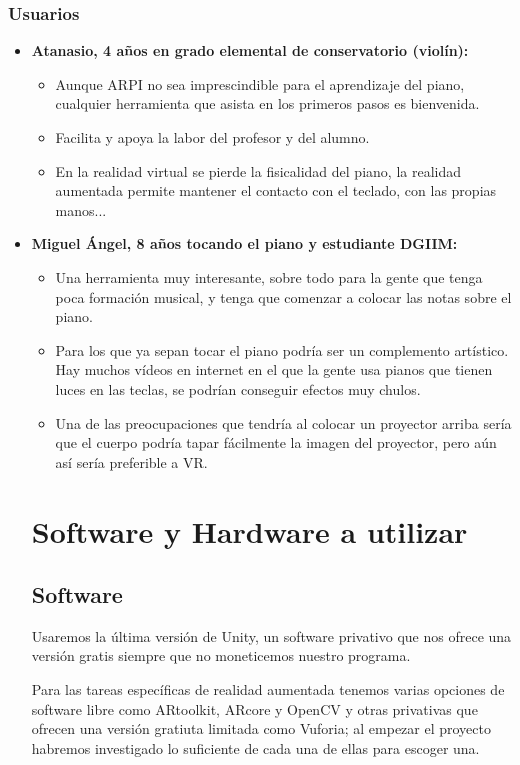 \subsubsection{Usuarios}
\begin{itemize}
	\item \textbf{Atanasio, 4 años en grado elemental de conservatorio (violín):} \label{tacho}
	\begin{itemize}
		\item Aunque ARPI no sea imprescindible para el aprendizaje del piano,
		cualquier herramienta que asista en los primeros pasos es bienvenida.
		\item Facilita y apoya la labor del profesor y del alumno.
		\item En la realidad virtual se pierde la fisicalidad del piano, la realidad aumentada
		permite mantener el contacto con el teclado, con las propias manos...
	\end{itemize}
		\item \textbf{Miguel Ángel, 8 años tocando el piano y estudiante DGIIM:}
		\begin{itemize}
			\item Una herramienta muy interesante, sobre todo para la gente que tenga 
			poca formación musical, y tenga que comenzar a colocar las notas sobre el piano.
			\item Para los que ya sepan tocar el piano podría ser un complemento artístico. 
			Hay muchos vídeos en internet en el que la gente usa pianos que tienen luces en 
			las teclas, se podrían conseguir efectos muy chulos.
			\item Una de las preocupaciones que tendría al colocar un proyector arriba 
			sería que el cuerpo podría tapar fácilmente la imagen del proyector, pero aún
			así sería preferible a VR.
\end{itemize}

\section{Software y Hardware a utilizar}
\subsection{Software}
Usaremos la última versión de Unity, un software privativo que nos
ofrece una versión gratis siempre que no moneticemos nuestro
programa.

Para las tareas específicas de realidad aumentada tenemos varias
opciones de software libre como ARtoolkit, ARcore y OpenCV y otras privativas
que ofrecen una versión gratiuta limitada como Vuforia;
al empezar el proyecto habremos investigado lo suficiente de cada
una de ellas para escoger una.


\end{itemize}
